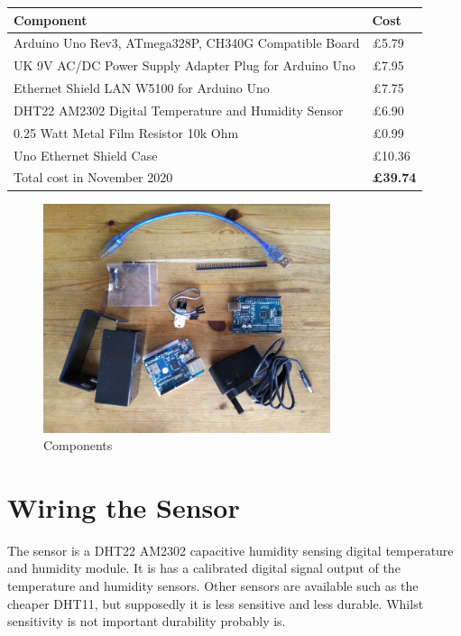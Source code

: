 \documentclass[a4paper, 11pt]{article}
\begin{document}
\begin{tabular}{ll}
  \textbf{Component} & \textbf{Cost} \\ 
  \hline
  Arduino Uno Rev3, ATmega328P, CH340G Compatible Board & \pounds 5.79 \\
  UK 9V AC/DC Power Supply Adapter Plug for Arduino Uno & \pounds 7.95 \\
  Ethernet Shield LAN W5100 for Arduino Uno             & \pounds 7.75 \\
  DHT22 AM2302 Digital Temperature and Humidity Sensor  & \pounds 6.90 \\
  0.25 Watt Metal Film Resistor 10k Ohm                 & \pounds 0.99 \\
  Uno Ethernet Shield Case                              & \pounds 10.36 \\
  \hline
  Total cost in November 2020                   & \textbf{\pounds 39.74}  \\
\end{tabular}

\begin{figure}[H]
  \centering
  \includegraphics[width=0.75\textwidth]{components.jpg}
  \caption{Components}
\end{figure}

\section{Wiring the Sensor}
\label{sec:wiring}

The sensor is a DHT22 AM2302 capacitive humidity sensing digital temperature and humidity module.
It is has a calibrated digital signal output of the temperature and humidity sensors.
Other sensors are available such as the cheaper DHT11,
but supposedly it is less sensitive and less durable.
Whilst sensitivity is not important
durability probably is.
\end{document}
